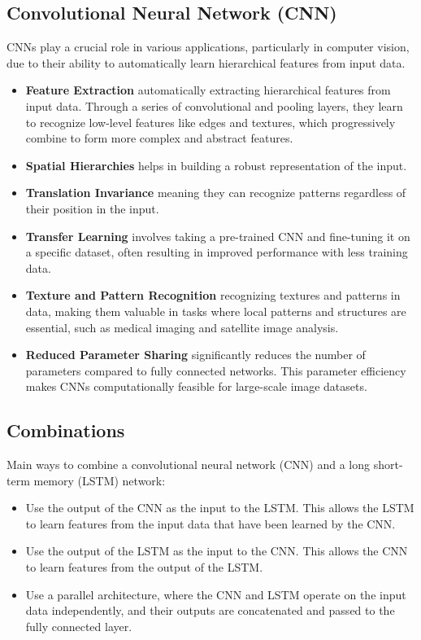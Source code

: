 \documentclass{article}
\begin{document}
\subsection{Convolutional Neural Network (CNN)}
CNNs play a crucial role in various applications, particularly in computer vision, due to their ability to automatically learn hierarchical features from input data.
\begin{itemize}
    \item \textbf{Feature Extraction} automatically extracting hierarchical features from input data. Through a series of convolutional and pooling layers, they learn to recognize low-level features like edges and textures, which progressively combine to form more complex and abstract features\cite{r1}.
    \item \textbf{Spatial Hierarchies}  helps in building a robust representation of the input.
    \item \textbf{Translation Invariance} meaning they can recognize patterns regardless of their position in the input. 
    \item \textbf{Transfer Learning} involves taking a pre-trained CNN and fine-tuning it on a specific dataset, often resulting in improved performance with less training data.
    \item \textbf{Texture and Pattern Recognition} recognizing textures and patterns in data, making them valuable in tasks where local patterns and structures are essential, such as medical imaging and satellite image analysis\cite{r2}.
    \item \textbf{Reduced Parameter Sharing} significantly reduces the number of parameters compared to fully connected networks. This parameter efficiency makes CNNs computationally feasible for large-scale image datasets.
\end{itemize}

\subsection{Combinations}
Main ways to combine a convolutional neural network (CNN) and a long short-term memory (LSTM) network:

\begin{itemize}
    \item Use the output of the CNN as the input to the LSTM. This allows the LSTM to learn features from the input data that have been learned by the CNN.
    \item Use the output of the LSTM as the input to the CNN. This allows the CNN to learn features from the output of the LSTM.
    \item Use a parallel architecture, where the CNN and LSTM operate on the input data independently, and their outputs are concatenated and passed to the fully connected layer.
\end{itemize}
\end{document}
